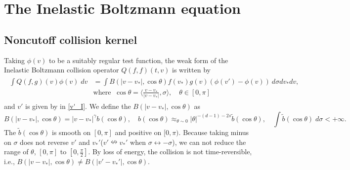 \documentclass[reqno,10pt]{amsart}
\numberwithin{equation}{section}
\begin{document}
\section{The Inelastic Boltzmann equation}
\subsection{Noncutoff collision kernel}
Taking $\phi(v)$ to be a suitably regular test function, the weak form of the Inelastic Boltzmann collision operator $Q(f,f)(t,v)$ is written by 
\begin{align} \label{Q_nc_I'}
\begin{split}
        \int Q(f,g)(v) \phi(v) \; dv &= \int B(|v-v_*|, \cos \theta)f(v_*)g(v)(\phi(v')-\phi(v))\: d\sigma dv_*dv,\\
     \quad &\text{where}\;\;\cos\theta = \langle\frac{v-v_*}{|v-v_*|}, \sigma\rangle, \quad \theta \in [0, \pi]
\end{split}
\end{align}
and $v'$ is given by in \eqref{v'_I}. We define the $B(|v-v_*|, \cos \theta)$ as   
\begin{equation} \label{B_nc_I'}
    B(|v-v_*|,\cos \theta)=|v-v_*|^{\gamma}b(\cos\theta), \quad b(\cos\theta) \approx_{\theta \sim 0} |\theta|^{-(d-1)-2s} \tilde{b}(\cos\theta), \quad
    \int  \tilde{b}(\cos\theta) \;d\sigma < +\infty.
\end{equation}
The $\tilde{b}(\cos\theta)$ is smooth on $[0,\pi]$ and positive on $[0,\pi).$ Because taking minus on $\sigma$ does not reverse $v'$ and ${v_*'}$($v' \nleftrightarrow v_*'$ when $\sigma \leftrightarrow -\sigma$), we can not reduce the range of $\theta$, $[0, \pi]$ to $[0, \frac{\pi}{2}].$ By loss of energy, the collision is not time-reversible, i.e., $B(|v-v_*|,\cos\theta) \neq B(|v'-v_*'|,\cos\theta).$  \vspace{3mm}
\end{document}
